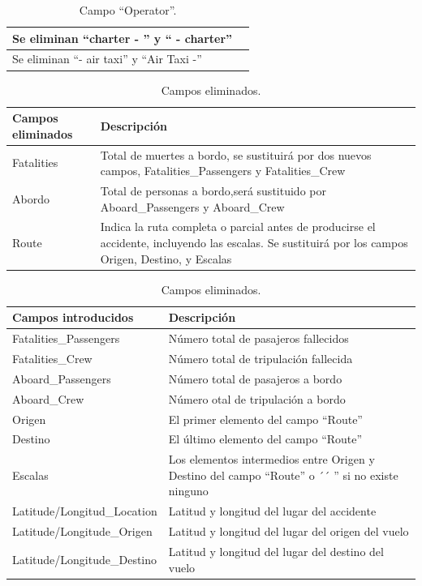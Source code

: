 \documentclass[a4paper,10pt]{article}
\begin{document}
\begin{table}[htbp]
\centering
\begin{tabular}{p{2cm} p{10cm}}
\hline \hline
Se eliminan ``charter - '' y `` - charter''&\\
\hline
Se eliminan ``- air taxi'' y ``Air Taxi -''&\\
\hline \hline

\end{tabular}
\caption{Campo ``Operator''.}
\label{tabla:autores}
\end{table}

\pagebreak

\singlespacing
\begin{table}[htbp]
\centering
\begin{tabular}{p{3cm} p{7cm}}
\hline \hline
Campos eliminados& Descripci\'on\\
\hline \hline
Fatalities &Total de muertes a bordo, se sustituir\'a por dos nuevos campos, Fatalities\_Passengers y Fatalities\_Crew\\
\hline
Abordo&Total de personas a bordo,ser\'a sustituido por Aboard\_Passengers y Aboard\_Crew\\
\hline
Route & Indica la ruta completa o parcial antes de producirse el accidente, incluyendo las escalas. Se sustituir\'a por los campos Origen, Destino, y Escalas\\
\hline \hline
\end{tabular}
\caption{Campos eliminados.}
\label{tabla:autores}
\end{table}
\pagebreak
\begin{table}[htbp]
\centering
\begin{tabular}{p{5cm} p{5cm}}
\hline \hline
Campos introducidos &Descripci\'on\\
\hline \hline
\hline
Fatalities\_Passengers &N\'umero total de pasajeros fallecidos\\
\hline
Fatalities\_Crew&N\'umero total de tripulaci\'on fallecida\\
\hline
Aboard\_Passengers & N\'umero total de pasajeros a bordo\\
\hline
Aboard\_Crew &N\'umero otal de tripulaci\'on a bordo\\
\hline
Origen&El primer elemento del campo ``Route''\\
\hline
Destino& El \'ultimo elemento del campo ``Route''\\
\hline
Escalas & Los elementos intermedios entre Origen y Destino del campo ``Route'' o ´´ '' si no existe ninguno\\
\hline
Latitude/Longitud\_Location & Latitud  y longitud del lugar del accidente\\
\hline
Latitude/Longitude\_Origen&Latitud  y longitud del lugar del origen del vuelo\\
\hline
Latitude/Longitude\_Destino&Latitud  y longitud del lugar del destino del vuelo\\
\hline \hline
\end{tabular}
\caption{Campos eliminados.}
\label{tabla:autores}
\end{table}
\end{document}
